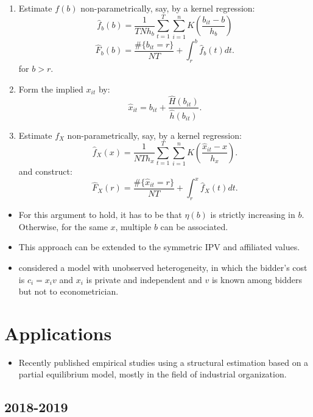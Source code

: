 \documentclass[]{book}
\providecommand{\tightlist}{%
  \setlength{\itemsep}{0pt}\setlength{\parskip}{0pt}}
\begin{document}
\begin{enumerate}
\def\labelenumi{\arabic{enumi}.}
\tightlist
\item
  Estimate \(f(b)\) non-parametrically, say, by a kernel regression: \[
  \hat{f}_b(b) = \frac{1}{TN h_b}\sum_{t = 1}^T \sum_{i = 1}^n K\left(\frac{b_{it} - b}{h_b}\right)
  \] \[
  \widehat{F}_b(b) = \frac{\#\{b_{it} = r\}}{NT} +  \int_{r}^b \hat{f}_b(t) dt.
  \] for \(b > r\).
\item
  Form the implied \(x_{it}\) by: \[
  \hat{x}_{it} = b_{it} + \frac{\widehat{H}(b_{it})}{\hat{h}(b_{it})}.
  \]
\item
  Estimate \(f_X\) non-parametrically, say, by a kernel regression: \[
  \hat{f}_X(x) = \frac{1}{NT h_x} \sum_{t = 1}^T \sum_{i = 1}^n K\left(\frac{\hat{x}_{it} - x}{h_x}\right).
  \] and construct: \[
  \widehat{F}_X(r) = \frac{\#\{\hat{x}_{it} = r\}}{NT} + \int_r^x \hat{f}_X(t) dt.
  \]
\end{enumerate}

\begin{itemize}
\tightlist
\item
  For this argument to hold, it has to be that \(\eta(b)\) is strictly
  increasing in \(b\). Otherwise, for the same \(x\), multiple \(b\) can
  be associated.
\item
  This approach can be extended to the symmetric IPV and affiliated
  values.
\item
  \citet{krasnokutskayaIdentificationEstimationAuction2011} considered a
  model with unobserved heterogeneity, in which the bidder's cost is
  \(c_i = x_i v\) and \(x_i\) is private and independent and \(v\) is
  known among bidders but not to econometrician.
\end{itemize}

\chapter{Applications}\label{applications}

\begin{itemize}
\tightlist
\item
  Recently published empirical studies using a structural estimation
  based on a partial equilibrium model, mostly in the field of
  industrial organization.
\end{itemize}

\section{2018-2019}\label{section}
\end{document}
